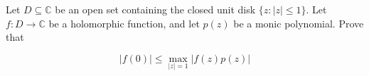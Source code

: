 Let \(D \subseteq \mathbb{C}\) be an open set containing the closed unit disk \(\{z \colon  |z| \leq 1\}\). Let \(f \colon  D \to \mathbb{C}\) be a holomorphic function, and let \(p(z)\) be a monic polynomial. Prove that

\[
|f(0)| \leq \max_{|z|=1} |f(z)p(z)|
\]